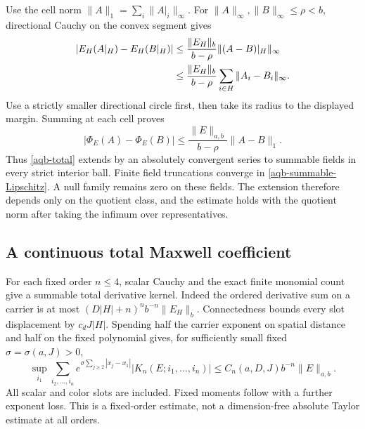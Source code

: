 \documentclass[11pt]{article}
\theoremstyle{remark}
\begin{document}
Use the cell norm $\|A\|_1=\sum_i\|A|_i\|_\infty$.
For $\|A\|_\infty,\|B\|_\infty\le\rho<b$, directional
Cauchy on the convex segment gives
\begin{align}
 |E_H(A|_H)-E_H(B|_H)|
 &\le\frac{\|E_H\|_b}{b-\rho}
                          \|(A-B)|_H\|_\infty\notag\\
 &\le\frac{\|E_H\|_b}{b-\rho}
                          \sum_{i\in H}\|A_i-B_i\|_\infty.
 \label{aqb-local-Lipschitz}
\end{align}
Use a strictly smaller directional circle first, then take its
radius to the displayed margin. Summing at each cell proves
\begin{equation}
 |\Phi_E(A)-\Phi_E(B)|
       \le\frac{\|E\|_{a,b}}{b-\rho}\|A-B\|_1.
 \label{aqb-summable-Lipschitz}
\end{equation}
Thus \eqref{aqb-total} extends by an absolutely convergent series
to summable fields in every strict interior ball. Finite field
truncations converge in \eqref{aqb-summable-Lipschitz}. A null
family remains zero on these fields. The extension therefore
depends only on the quotient class, and the estimate holds with
the quotient norm after taking the infimum over representatives.

\subsection{A continuous total Maxwell coefficient}
\label{aqb-beta-section}

For each fixed order $n\le4$, scalar Cauchy and the exact finite
monomial count give a summable total derivative kernel. Indeed
the ordered derivative sum on a carrier is at most
$(D|H|+n)^n b^{-n}\|E_H\|_b$. Connectedness bounds every
slot displacement by $c_dJ|H|$. Spending half the carrier
exponent on spatial distance and half on the fixed polynomial
gives, for sufficiently small fixed $\sigma=\sigma(a,J)>0$,
\begin{equation}
 \sup_{i_1}\sum_{i_2,\ldots,i_n}
 e^{\sigma\sum_{j\ge2}|x_j-x_1|}
 |K_n(E;i_1,\ldots,i_n)|
       \le C_n(a,D,J)b^{-n}\|E\|_{a,b}.
 \label{aqb-kernel-bound}
\end{equation}
All scalar and color slots are included. Fixed moments follow
with a further exponent loss. This is a fixed-order estimate,
not a dimension-free absolute Taylor estimate at all orders.
\end{document}
